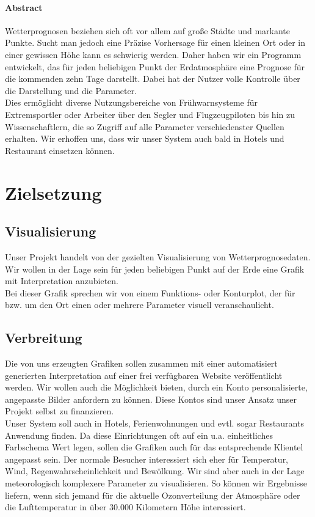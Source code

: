 \documentclass[a4paper,twoside,12pt,titlepage]{article}
\begin{document}

\pagestyle{empty}
\tableofcontents
\thispagestyle{empty}
\pagestyle{plain}
\newpage

\paragraph{Abstract}
$ $\\
Wetterprognosen beziehen sich oft vor allem auf große Städte und markante Punkte. Sucht man jedoch eine Präzise Vorhersage für einen kleinen Ort oder in einer gewissen Höhe kann es schwierig werden. Daher haben wir ein Programm entwickelt, das für jeden beliebigen Punkt der Erdatmosphäre eine Prognose für die kommenden zehn Tage darstellt. Dabei hat der Nutzer volle Kontrolle über die Darstellung und die Parameter.\\
Dies ermöglicht diverse Nutzungsbereiche von Frühwarnsysteme für Extremsportler oder Arbeiter über den Segler und Flugzeugpiloten bis hin zu Wissenschaftlern, die so Zugriff auf alle Parameter verschiedenster Quellen erhalten. Wir erhoffen uns, dass wir unser System auch bald in Hotels und Restaurant einsetzen können.

\section{Zielsetzung}
\subsection{Visualisierung}
Unser Projekt handelt von der gezielten Visualisierung von Wetterprognosedaten. Wir wollen in der Lage sein für jeden beliebigen Punkt auf der Erde eine Grafik mit Interpretation anzubieten.\\ Bei dieser Grafik sprechen wir von einem Funktions- oder Konturplot, der für bzw. um den Ort einen oder mehrere Parameter visuell veranschaulicht.
\subsection{Verbreitung}
Die von uns erzeugten Grafiken sollen zusammen mit einer automatisiert generierten Interpretation auf einer frei verfügbaren Website veröffentlicht werden. Wir wollen auch die Möglichkeit bieten, durch ein Konto personalisierte, angepasste Bilder anfordern zu können. Diese Kontos sind unser Ansatz unser Projekt selbst zu finanzieren.\\
Unser System soll auch in Hotels, Ferienwohnungen und evtl. sogar Restaurants Anwendung finden. Da diese Einrichtungen oft auf ein u.a. einheitliches Farbschema Wert legen, sollen die Grafiken auch für das entsprechende Klientel angepasst sein. Der normale Besucher interessiert sich eher für Temperatur, Wind, Regenwahrscheinlichkeit und Bewölkung. Wir sind aber auch in der Lage meteorologisch komplexere Parameter zu visualisieren. So können wir Ergebnisse liefern, wenn sich jemand für die aktuelle Ozonverteilung der Atmosphäre oder die Lufttemperatur in über 30.000 Kilometern Höhe interessiert.
\end{document}
